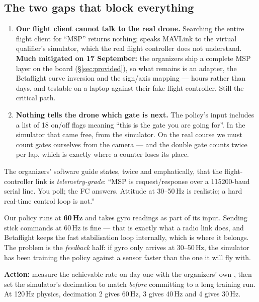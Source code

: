 \subsection*{The two gaps that block everything}

\begin{enumerate}
\item \textbf{Our flight client cannot talk to the real drone.} Searching the entire flight client
for ``MSP'' returns nothing;  speaks MAVLink to the virtual qualifier's
simulator, which the real flight controller does not understand. \textbf{Much mitigated on 17
September:} the organizers ship a complete MSP layer on the board (\S\ref{sec:provided}), so what
remains is an adapter, the Betaflight curve inversion and the sign/axis mapping --- hours rather than
days, and testable on a laptop against their fake flight controller. Still the critical path.

\item \textbf{Nothing tells the drone which gate is next.} The policy's input includes a list of 18
on/off flags meaning ``this is the gate you are going for''. In the simulator that came free, from
the simulator. On the real course we must count gates ourselves from the camera --- and the double
gate counts twice per lap, which is exactly where a counter loses its place.
\end{enumerate}

\begin{warnbox}
The organizers' software guide states, twice and emphatically, that the flight-controller link is
\emph{telemetry-grade}: ``MSP is request/response over a 115200-baud serial line. You poll; the FC
answers. Attitude at 30--50\,Hz is realistic; a hard real-time control loop is not.''

Our policy runs at \textbf{60\,Hz} and takes gyro readings as part of its input. Sending stick
commands at 60\,Hz is fine --- that is exactly what a radio link does, and Betaflight keeps the fast
stabilisation loop internally, which is where it belongs. The problem is the \emph{feedback} half: if
gyro only arrives at 30--50\,Hz, the simulator has been training the policy against a sensor faster
than the one it will fly with.

\textbf{Action:} measure the achievable rate on day one with the organizers' own
, then set the simulator's decimation to match \emph{before}
committing to a long training run. At 120\,Hz physics, decimation 2 gives 60\,Hz, 3 gives 40\,Hz and
4 gives 30\,Hz.
\end{warnbox}

